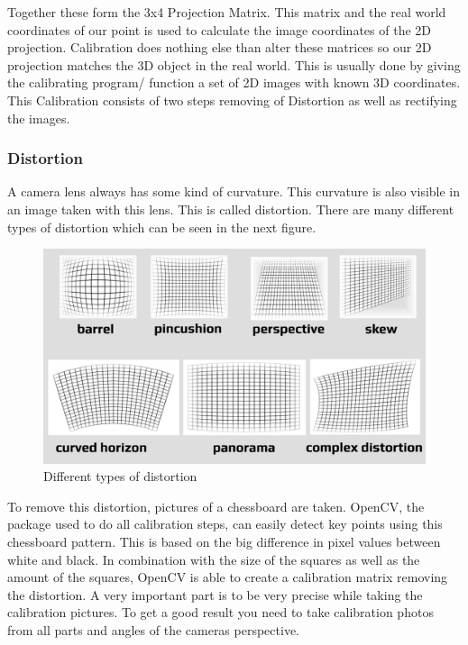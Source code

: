 \documentclass[journal,onecolumn]{IEEEtran}
\begin{document}
\noindent
Together these form the 3x4 Projection Matrix. This matrix and the real world coordinates of our point is used to calculate the image coordinates of the 2D projection. Calibration does nothing else than alter these matrices so our 2D projection matches the 3D object in the real world. This is usually done by giving the calibrating program/ function a set of 2D images with known 3D coordinates.
This Calibration consists of two steps removing of Distortion as well as rectifying the images\cite{ImageRectification}. \newline
\subsubsection{Distortion}
\noindent
A camera lens always has some kind of curvature. This curvature is also visible in an image taken with this lens. This is called distortion. There are many different types of distortion which can be seen in the next figure.
\begin{figure}[H]
	\centering
	\includegraphics[scale=0.3]{distortion.jpg}
	\captionsetup{justification=centering}
	\caption{Different types of distortion}
\end{figure}
\noindent
To remove this distortion, pictures of a chessboard are taken. OpenCV, the package used to do all calibration steps, can easily detect key points using this chessboard pattern. This is based on the big difference in pixel values between white and black. In combination with the size of the squares as well as the amount of the squares, OpenCV is able to create a calibration matrix removing the distortion.\newline
A very important part is to be very precise while taking the calibration pictures. To get a good result you need to take calibration photos from all parts and angles of the cameras perspective.\newline
\end{document}
